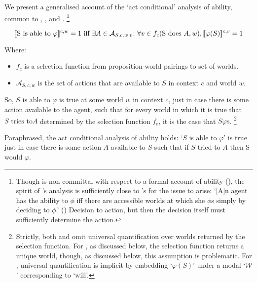 \begin{note}[ACA]
  We present a generalised account of the `act conditional' analysis of ability, common to \textcite{Boylan:2020aa}, \textcite{Mandelkern:2017aa}, and \textcite{Schwarz:2020aa}.%
  \footnote{
    Though \citeauthor{Schwarz:2020aa} is non-committal with respect to a formal account of ability (\citeyear[cf.][13]{Schwarz:2020aa}), the spirit of \citeauthor{Schwarz:2020aa}'s analysis is sufficiently close to \citeauthor{Boylan:2020aa}'s for the issue to arise:
    `[A]n agent has the ability to \(\phi\) iff there are accessible worlds at which she \(\phi\)s simply by deciding to \(\phi\).' (\citeyear[19]{Schwarz:2020aa})
    Decision to action, but then the decision itself must sufficiently determine the action.
  }

  \[%
    \sem[c,w]{\text{S is able to }\varphi} = 1\text{ iff }\exists A \in \mathcal{A}_{S,c,w,t}\colon \forall v \in f_{c}(\text{S does }A,w),  \sem[c,v]{\varphi(S)} = 1%
  \]

  Where:
  \begin{itemize}
  \item
    \(f_{c}\) is a selection function from proposition-world pairings to set of worlds.
  \item
    \(\mathcal{A}_{S,c,w}\) is the set of actions that are available to \(S\) in context \(c\) and world \(w\).
  \end{itemize}
  So, \(S\text{ is able to }\varphi\) is true at some world \(w\) in context \(c\), just in case there is some action available to the agent, such that for every world in which it is true that \(S\text{ tries to}A\) determined by the selection function \(f_{c}\), it is the case that \(S \varphi\text{s}\).%
  \footnote{
    Strictly, both \citeauthor{Mandelkern:2017aa} and \citeauthor{Boylan:2020aa} omit universal quantification over worlds returned by the selection function.
    For \citeauthor{Mandelkern:2017aa}, as discussed below, the selection function returns a unique world, though, as discussed below, this assumption is problematic.
    For \citeauthor{Boylan:2020aa}, universal quantification is implicit by embedding `\(\varphi(S)\)' under a modal `\(\mathcal{W}\)' corresponding to `will'.
  }

  Paraphrased, the act conditional analysis of ability holds:
  `\(S\) is able to \(\varphi\)' is true just in case there is some action \(A\) available to \(S\) such that if \(S\) tried to \(A\) then S would \(\varphi\).
\end{note}

